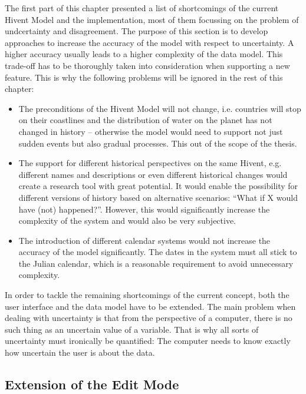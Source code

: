 The first part of this chapter presented a list of shortcomings of the current Hivent Model and the implementation, most of them focussing on the problem of undcertainty and disagreement. The purpose of this section is to develop approaches to increase the accuracy of the model with respect to uncertainty. A higher accuracy usually leads to a higher complexity of the data model. This trade-off has to be thoroughly taken into consideration when supporting a new feature. This is why the following problems will be ignored in the rest of this chapter:

\begin{itemize}
  \item The preconditions of the Hivent Model will not change, i.e. countries will stop on their coastlines and the distribution of water on the planet has not changed in history -- otherwise the model would need to support not just sudden events but also gradual processes. This out of the scope of the thesis.
  \item The support for different historical perspectives on the same Hivent, e.g. different names and descriptions or even different historical changes would create a research tool with great potential. It would enable the possibility for different versions of history based on alternative scenarios: ``What if X would have (not) happened?''. However, this would significantly increase the complexity of the system and would also be very subjective.
  \item The introduction of different calendar systems would not increase the accuracy of the model significantly. The dates in the system must all stick to the Julian calendar, which is a reasonable requirement to avoid unnecessary complexity.
\end{itemize}

In order to tackle the remaining shortcomings of the current concept, both the user interface and the data model have to be extended. The main problem when dealing with uncertainty is that from the perspective of a computer, there is no such thing as an uncertain value of a variable. That is why all sorts of uncertainty must ironically be quantified: The computer needs to know exactly how uncertain the user is about the data.

\subsection{Extension of the Edit Mode} %
\label{sub:extension_of_the_edit_mode}

